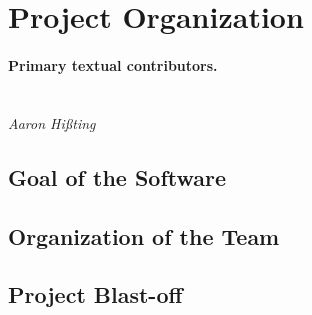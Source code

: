 \section{Project Organization}
\label{sec:project_organization}

\paragraph{Primary textual contributors.}
\mbox{}\\\emph{Aaron Hißting}

\subsection{Goal of the Software}


\subsection{Organization of the Team}


\subsection{Project Blast-off}

